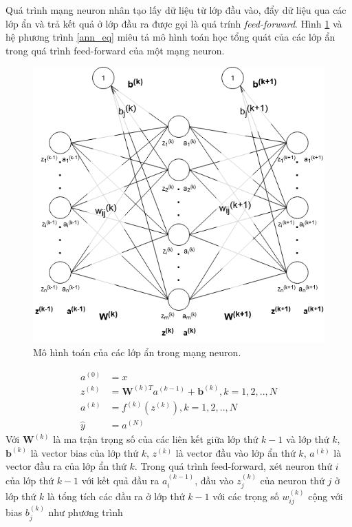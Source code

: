 Quá trình mạng neuron nhân tạo lấy dữ liệu từ lớp đầu vào, đẩy dữ liệu qua các lớp ẩn và trả kết quả ở lớp đầu ra được gọi là quá trính \emph{feed-forward}. Hình \ref{fig:ann} và hệ phương trình \ref{ann_eq} miêu tả mô hình toán học tổng quát của các lớp ẩn trong quá trình feed-forward của một mạng neuron.
\begin{figure}[ht!]
	\centerline{\includegraphics[scale=0.6]{images/ann.png}}
  	\caption{Mô hình toán của các lớp ẩn trong mạng neuron.}
  	\label{fig:ann}
\end{figure}
\begin{align}
	a^{(0)}&=x \nonumber\\
	z^{(k)}&={\boldsymbol{W}^{(k)T}}{a^{(k-1)}}+{\boldsymbol{b}}^{(k)},k=1,2,..,N \label{ann_eq}\\
	a^{(k)}&=f^{(k)}\left(z^{(k)}\right),k=1,2,..,N \nonumber\\
	\widehat{y}&=a^{(N)} \nonumber
\end{align}
Với $\boldsymbol{W}^{(k)}$ là ma trận trọng số của các liên kết giữa lớp thứ $k-1$ và lớp thứ $k$, $\boldsymbol{b}^{(k)}$ là vector bias của lớp thứ $k$, $z^{(k)}$ là vector đầu vào lớp ẩn thứ $k$, $a^{(k)}$ là vector đầu ra của lớp ẩn thứ $k$. Trong quá trình feed-forward, xét neuron thứ $i$ của lớp thứ $k-1$ với kết quả đầu ra $a^{(k-1)}_i$, đầu vào $z^{(k)}_j$ của neuron thứ $j$ ở lớp thứ $k$ là tổng tích các đầu ra ở lớp thứ $k-1$ với các trọng số $w^{(k)}_{ij}$ cộng với bias $b^{(k)}_{j}$ như phương trình
